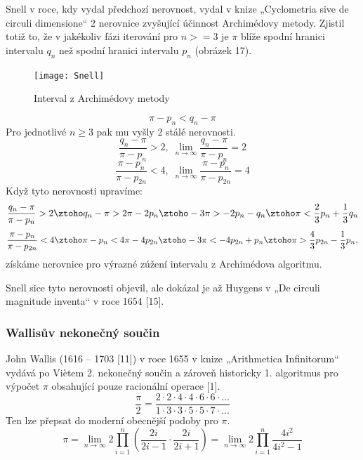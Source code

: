 \documentclass[rocnikovka]{gzwroc} %
\begin{document}
Snell v roce, kdy vydal předchozí nerovnost, vydal v knize „Cyclometria sive de circuli dimensione“ 2 nerovnice zvyšující účinnost Archimédovy metody. Zjistil totiž to, že v jakékoliv fázi iterování pro $n>=3$ je $\pi$ blíže spodní hranici intervalu $q_n$ než spodní hranici intervalu $p_n$ (obrázek 17).
\begin{figure}[!ht]
\texttt{[image: Snell]}
\caption{Interval z Archimédovy metody}
\label{fig:kruh}
\end{figure}
$$
\pi-p_n<q_n-\pi
$$
Pro jednotlivé $n\geq3$ pak mu vyšly 2 stálé nerovnosti.
\begin{equation}
\frac{q_n-\pi}{\pi-p_n}>2, \; \lim_{n\to\infty} \frac{q_n-\pi}{\pi-p_n}=2
\end{equation}
\begin{equation}
\frac{\pi-p_n}{\pi-p_{2n}}<4, \; \lim_{n\to\infty} \frac{\pi-p_n}{\pi-p_{2n}}=4
\end{equation}
Když tyto nerovnosti upravíme:
$$
\frac{q_n-\pi}{\pi-p_n}>2 \ztoho q_n-\pi>2\pi-2p_n \ztoho -3\pi>-2p_n-q_n \ztoho \pi<\frac{2}{3}p_n+\frac{1}{3}q_n
$$
$$
\frac{\pi-p_n}{\pi-p_{2n}}<4 \ztoho \pi-p_n<4\pi-4p_{2n} \ztoho -3\pi<-4p_{2n}+p_n \ztoho \pi>\frac{4}{3}p_{2n}-\frac{1}{3}p_n,
$$
získáme nerovnice pro výrazné zúžení intervalu z Archimédova algoritmu.

Snell sice tyto nerovnosti objevil, ale dokázal je až Huygens v „De circuli magnitude inventa“ v roce 1654 [15].
\subsubsection{Wallisův nekonečný součin}
John Wallis (1616 – 1703 [11]) v roce 1655 v knize „Arithmetica Infinitorum“ vydává po Viètem 2. nekonečný součin a zároveň historicky 1. algoritmus pro výpočet $\pi$ obsahující pouze racionální operace [1].
\begin{equation}
\frac{\pi}{2}=\frac{2\cdot2\cdot4\cdot4\cdot6\cdot6\cdot...}{1\cdot3\cdot3\cdot5\cdot5\cdot7\cdot...}
\end{equation}
Ten lze přepsat do moderní obecnější podoby pro $\pi$.
\begin{equation}
\pi=\lim_{n\to\infty}2\prod_{i=1}^{n} \left(\frac{2i}{2i-1}\cdot\frac{2i}{2i+1} \right)=\lim_{n\to\infty}2\prod_{i=1}^{n} \frac{4i^2}{4i^2-1}
\end{equation}
\end{document}
